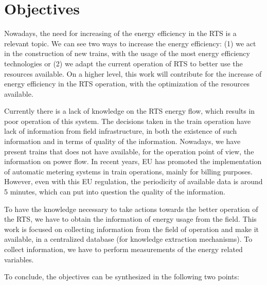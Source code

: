 

\section{Objectives}

Nowadays, the need for increasing of the energy efficiency in the \ac{RTS} is a relevant topic.
We can see two ways to increase the energy efficiency: (1) we act in the construction of new trains, with the usage of the most energy efficiency technologies or (2) we adapt the current operation of \ac{RTS} to better use the resources available.
On a higher level, this work will contribute for the increase of energy efficiency in the \ac{RTS} operation, with the optimization of the resources available.

Currently there is a lack of knowledge on the \ac{RTS} energy flow, which results in poor operation of this system. The decisions taken in the train operation have lack of information from field infrastructure, in both the existence of such information and in terms of quality of the information. Nowadays, we have present trains that does not have available, for the operation point of view, the information on power flow. In recent years, \ac{EU} has promoted the implementation of automatic metering systems in train operations, mainly for billing purposes. However, even with this \ac{EU} regulation, the periodicity of available data is around 5 minutes, which can put into question the quality of the information.

To have the knowledge necessary to take actions towards the better operation of the \ac{RTS}, we have to obtain the information of energy usage from the field.
This work is focused on collecting information from the field of operation and make it available, in a centralized database (for knowledge extraction mechanisms). 
To collect information, we have to perform measurements of the energy related variables.

To conclude, the objectives can be synthesized in the following two points:

